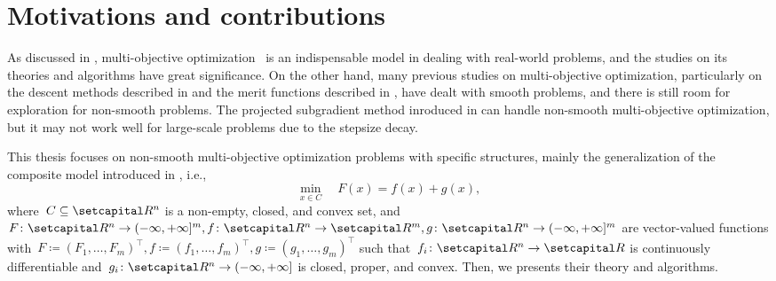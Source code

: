 \documentclass[../main]{subfiles}
\begin{document}
\section{Motivations and contributions} 
As discussed in , multi-objective optimization~ is an indispensable model in dealing with real-world problems, and the studies on its theories and algorithms have great significance.
On the other hand, many previous studies on multi-objective optimization, particularly on the descent methods described in  and the merit functions described in , have dealt with smooth problems, and there is still room for exploration for non-smooth problems.
The projected subgradient method inroduced in  can handle non-smooth multi-objective optimization, but it may not work well for large-scale problems due to the stepsize decay.

This thesis focuses on non-smooth multi-objective optimization problems with specific structures, mainly the generalization of the composite model introduced in , i.e.,
\begin{equation} \label{eq:composite_MO}
    \min_{x \in C} \quad F(x) = f(x) + g(x)
,\end{equation} 
where~$C \subseteq \setR^n$ is a non-empty, closed, and convex set, and~$F \colon \setR^n \to (-\infty, +\infty]^m, f \colon \setR^n \to \setR^m, g \colon \setR^n \to (-\infty, +\infty]^m$ are vector-valued functions with~$F \coloneqq (F_1, \dots, F_m)^\top, f \coloneqq (f_1, \dots, f_m)^\top, g \coloneqq (g_1, \dots, g_m)^\top$ such that~$f_i \colon \setR^n \to \setR$ is continuously differentiable and~$g_i \colon \setR^n \to (-\infty, +\infty]$ is closed, proper, and convex.
Then, we presents their theory and algorithms.
\end{document}
